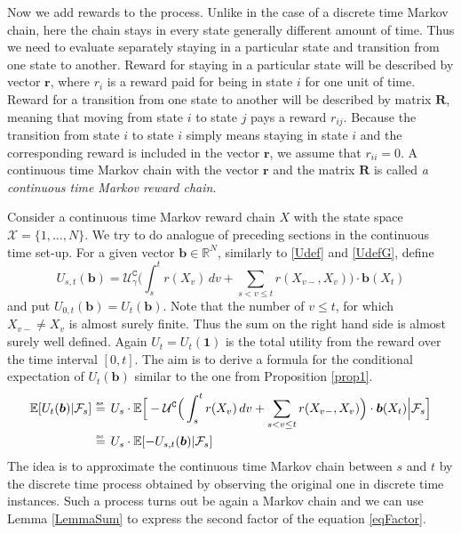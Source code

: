 Now we add rewards to the process. Unlike in the case of a discrete time Markov chain, here the chain stays in every state generally different amount of time. Thus we need to evaluate separately staying in a particular state and transition from one state to another. Reward for staying in a particular state will be described by vector $\bm{r}$, where $r_i$ is a reward paid for being in state $i$ for one unit of time. Reward for a transition from one state to another will be described by matrix $\bm{R}$, meaning that moving from state $i$ to state $j$ pays a reward $r_{ij}$. Because the transition from state $i$ to state $i$ simply means staying in state $i$ and the corresponding reward is included in the vector $\bm{r}$, we assume that $r_{ii}=0$. A continuous time Markov chain with the vector $\bm{r}$ and the matrix $\bm{R}$ is called {\em a continuous time Markov reward chain}.

Consider a continuous time Markov reward chain $X$ with the state space $\mathcal{X}=\{1,\dots,N\}$. We try to do analogue of preceding sections in the continuous time set-up. For a given vector $\bm{b}\in\mathbb{R}^N$, similarly to \eqref{Udef} and \eqref{UdefG}, define
\begin{equation}
\label{UdefC}
U_{s,t}(\bm{b})=\mathcal{U}_{\gamma}^{\texttt{C}}\Big(\int_s^t r(X_v)\,dv+\sum_{s< v\leq t} r(X_{v-},X_{v}) \Big)\cdot \bm{b}(X_t)
\end{equation}
and put $U_{0,t}(\bm{b})=U_{t}(\bm{b})$. Note that the number of $v\leq t$, for which $X_{v-}\neq X_{v}$ is almost surely finite. Thus the sum on the right hand side is almost surely well defined. Again $U_t=U_t(\bm{1})$ is the total utility from the reward over the time interval $[0,t]$. The aim is to derive a formula for the conditional expectation of $U_t(\bm{b})$ similar to the one from Proposition \ref{prop1}.
\begin{equation}
\label{eqFactor}
\begin{split}
\mathbb{E}[U_t(\bm{b})|\mathcal{F}_s]&\aseq U_s\cdot \mathbb{E}\Big[-\mathcal{U}^{\texttt{C}}\Big(\int_s^t r(X_v)\,dv + \sum_{s< v\leq t} r(X_{v-},X_{v})\Big)\cdot \bm{b}(X_t)\Big|\mathcal{F}_s\Big]\\
&\aseq U_s\cdot \mathbb{E}[-U_{s,t}(\bm{b})|\mathcal{F}_s]
\end{split}
\end{equation} 
The idea is to approximate the continuous time Markov chain between $s$ and $t$ by the discrete time 
process obtained by observing the original one in discrete time instances. Such a process turns out be again a Markov chain and we can use Lemma \ref{LemmaSum} to express the second factor of the equation \eqref{eqFactor}. 

